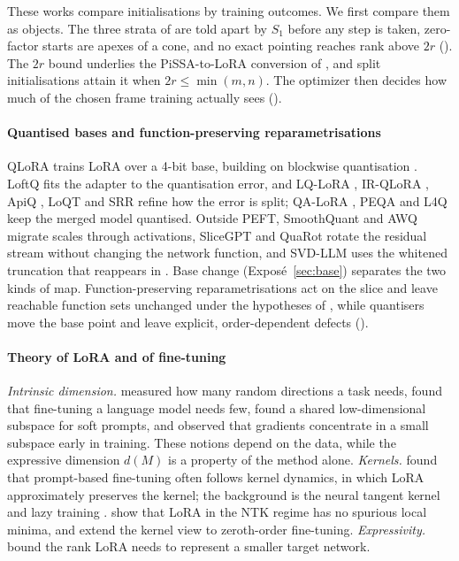These works compare initialisations by training outcomes. We first compare them as objects. The three strata of  are told apart by $S_1$ before any step is taken, zero-factor starts are apexes of a cone, and no exact pointing reaches rank above $2r$ (). The $2r$ bound underlies the PiSSA-to-LoRA conversion of \citet{meng2024pissa}, and split initialisations attain it when $2r\le\min(m,n)$. The optimizer then decides how much of the chosen frame training actually sees ().

\paragraph{Quantised bases and function-preserving reparametrisations}
QLoRA \citep{dettmers2023qlora} trains LoRA over a 4-bit base, building on blockwise quantisation \citep{dettmers20218}. LoftQ \citep{li2023loftq} fits the adapter to the quantisation error, and LQ-LoRA \citep{guo2023lq}, IR-QLoRA \citep{qin2024accurate}, ApiQ \citep{liao2024apiq}, LoQT \citep{loeschcke2024loqt} and SRR \citep{cho2026preserve} refine how the error is split; QA-LoRA \citep{xu2023qa}, PEQA \citep{kim2023memory} and L4Q \citep{jeon2024l4q} keep the merged model quantised. Outside PEFT, SmoothQuant \citep{xxiao2023smoothquant} and AWQ \citep{xlin2024awq} migrate scales through activations, SliceGPT \citep{xashkboos2024slicegpt} and QuaRot \citep{xashkboos2024quarot} rotate the residual stream without changing the network function, and SVD-LLM \citep{xwang2025svdllm} uses the whitened truncation that reappears in . Base change (Exposé~\ref{sec:base}) separates the two kinds of map. Function-preserving reparametrisations act on the slice and leave reachable function sets unchanged under the hypotheses of , while quantisers move the base point and leave explicit, order-dependent defects ().

\paragraph{Theory of LoRA and of fine-tuning}
\emph{Intrinsic dimension.} \citet{li2018measuring} measured how many random directions a task needs, \citet{aghajanyan2020intrinsic} found that fine-tuning a language model needs few, \citet{qin2021exploring} found a shared low-dimensional subspace for soft prompts, and \citet{gurari2018gradient} observed that gradients concentrate in a small subspace early in training. These notions depend on the data, while the expressive dimension $d(M)$ is a property of the method alone.
\emph{Kernels.} \citet{malladi2022kernel} found that prompt-based fine-tuning often follows kernel dynamics, in which LoRA approximately preserves the kernel; the background is the neural tangent kernel \citep{xjacot2018neural} and lazy training \citep{xchizat2019lazy}. \citet{jang2024lora} show that LoRA in the NTK regime has no spurious local minima, and \citet{li2026learning} extend the kernel view to zeroth-order fine-tuning.
\emph{Expressivity.} \citet{zeng2023expressive} bound the rank LoRA needs to represent a smaller target network.

